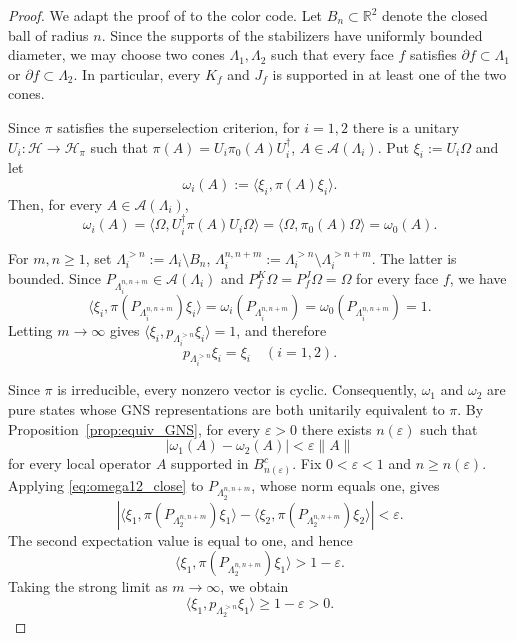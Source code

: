 \documentclass[a4paper,11pt]{article}
\theoremstyle{definition}
\theoremstyle{remark}
\theoremstyle{remark}
\begin{document}
\begin{proof}
    We adapt the proof of \cite[Proposition~5.2]{bols2025classification} to the color code. Let $B_n\subset\mathbb R^2$ denote the closed ball of radius $n$. Since the supports of the stabilizers have uniformly bounded diameter, we may choose two cones $\Lambda_1,\Lambda_2$ such that every face $f$ satisfies $\partial f\subset\Lambda_1$ or $\partial f\subset\Lambda_2$. In particular, every $K_f$ and $J_f$ is supported in at least one of the two cones.

    Since $\pi$ satisfies the superselection criterion, for $i=1,2$ there is a unitary $U_i:\mathcal H\to\mathcal H_\pi$ such that $\pi(A)=U_i\pi_0(A)U_i^\dagger$, $A\in\mathcal A(\Lambda_i)$. Put $\xi_i:=U_i\Omega$ and let
    \[
        \omega_i(A):=\langle\xi_i,\pi(A)\xi_i\rangle.
    \]
    Then, for every $A\in\mathcal A(\Lambda_i)$,
    \[
        \omega_i(A) = \langle\Omega,U_i^\dagger\pi(A)U_i\Omega\rangle = \langle\Omega,\pi_0(A)\Omega\rangle
        = \omega_0(A).
    \]

    For $m,n\geq1$, set $\Lambda_i^{>n}:=\Lambda_i\setminus B_n$, $\Lambda_i^{n,n+m}:=\Lambda_i^{>n}\setminus\Lambda_i^{>n+m}$. The latter is bounded. Since
    $P_{\Lambda_i^{n,n+m}}\in\mathcal A(\Lambda_i)$ and $P_f^K\Omega=P_f^J\Omega=\Omega$ for every face $f$, we have
    \[
        \langle\xi_i,\pi(P_{\Lambda_i^{n,n+m}})\xi_i\rangle = \omega_i(P_{\Lambda_i^{n,n+m}})=\omega_0(P_{\Lambda_i^{n,n+m}})=1.
    \]
    Letting $m\to\infty$ gives $\langle\xi_i,p_{\Lambda_i^{>n}}\xi_i\rangle=1$, and therefore
    \begin{equation}\label{eq:cone_projector_fix}
        p_{\Lambda_i^{>n}}\xi_i=\xi_i
        \quad  (i=1,2).
    \end{equation}

    Since $\pi$ is irreducible, every nonzero vector is cyclic. Consequently, $\omega_1$ and $\omega_2$ are pure states whose GNS representations are both unitarily equivalent to $\pi$.
    By Proposition~\ref{prop:equiv_GNS}, for every $\varepsilon>0$ there exists $n(\varepsilon)$ such that
    \begin{equation}\label{eq:omega12_close}
        |\omega_1(A)-\omega_2(A)| < \varepsilon\|A\|
    \end{equation}
    for every local operator $A$ supported in $B_{n(\varepsilon)}^c$. Fix $0<\varepsilon<1$ and $n\geq n(\varepsilon)$. Applying \eqref{eq:omega12_close} to $P_{\Lambda_2^{n,n+m}}$, whose norm equals one, gives
    \[
        \left|\langle\xi_1,\pi(P_{\Lambda_2^{n,n+m}})\xi_1\rangle-\langle\xi_2,\pi(P_{\Lambda_2^{n,n+m}})\xi_2\rangle\right|<\varepsilon.
    \]
    The second expectation value is equal to one, and hence
    \[
        \langle\xi_1,\pi(P_{\Lambda_2^{n,n+m}})\xi_1\rangle>1-\varepsilon.
    \]
    Taking the strong limit as $m\to\infty$, we obtain 
    \begin{equation}\label{eq:second_cone_positive}
        \langle\xi_1,p_{\Lambda_2^{>n}}\xi_1\rangle
        \geq 1-\varepsilon>0.
    \end{equation}


\end{proof}
\end{document}
